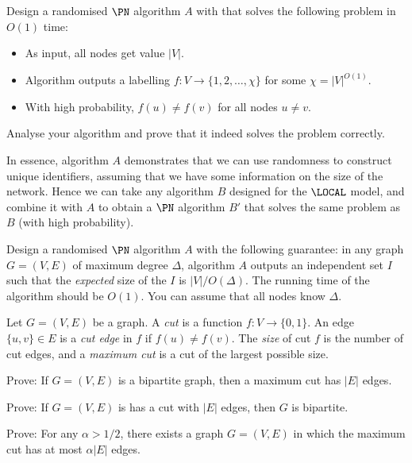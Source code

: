 \begin{ex}
    Design a randomised $\PN$ algorithm $A$ with that solves the following problem in $O(1)$ time:
    \begin{itemize}[noitemsep]
        \item As input, all nodes get value $|V|$.
        \item Algorithm outputs a labelling $f\colon V \to \{1,2,\dotsc,\chi\}$ for some $\chi = |V|^{O(1)}$.
        \item With high probability, $f(u) \ne f(v)$ for all nodes $u \ne v$.
    \end{itemize}
    Analyse your algorithm and prove that it indeed solves the problem correctly.

    In essence, algorithm $A$ demonstrates that we can use randomness to construct unique identifiers, assuming that we have some information on the size of the network. Hence we can take any algorithm $B$ designed for the $\LOCAL$ model, and combine it with $A$ to obtain a $\PN$ algorithm $B'$ that solves the same problem as $B$ (with high probability).
\end{ex}

\begin{ex}
    Design a randomised $\PN$ algorithm $A$ with the following guarantee: in any graph $G = (V,E)$ of maximum degree $\Delta$, algorithm $A$ outputs an independent set $I$ such that the \emph{expected} size of the $I$ is $|V|/O(\Delta)$. The running time of the algorithm should be $O(1)$. You can assume that all nodes know $\Delta$.
\end{ex}

\begin{ex}
    Let $G = (V,E)$ be a graph. A \emph{cut} is a function $f\colon V \to \{0,1\}$. An edge $\{u,v\} \in E$ is a \emph{cut edge} in $f$ if $f(u) \ne f(v)$. The \emph{size} of cut $f$ is the number of cut edges, and a \emph{maximum cut} is a cut of the largest possible size.
    \begin{subex}
        \item Prove: If $G = (V,E)$ is a bipartite graph, then a maximum cut has $|E|$ edges.
        \item Prove: If $G = (V,E)$ is has a cut with $|E|$ edges, then $G$ is bipartite.
        \item Prove: For any $\alpha > 1/2$, there exists a graph $G = (V,E)$ in which the maximum cut has at most $\alpha |E|$ edges.
    \end{subex}
\end{ex}

